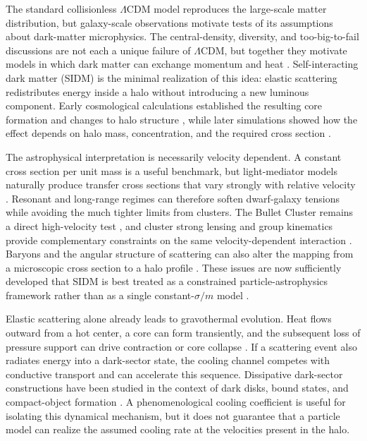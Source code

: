 \documentclass[12pt]{iopart}
\begin{document}
The standard collisionless $\Lambda$CDM model reproduces the large-scale
matter distribution, but galaxy-scale observations motivate tests of its
assumptions about dark-matter microphysics.  The central-density, diversity,
and too-big-to-fail discussions are not each a unique failure of
$\Lambda$CDM, but together they motivate models in which dark matter can
exchange momentum and heat \citep{BullockBoylan2017}.  Self-interacting dark
matter (SIDM) is the minimal realization of this idea: elastic scattering
redistributes energy inside a halo without introducing a new luminous
component.  Early cosmological calculations established the resulting core
formation and changes to halo structure \citep{Spergel2000,Dave2001,Colin2002},
while later simulations showed how the effect depends on halo mass,
concentration, and the required cross section
\citep{Elbert2015,GarrisonKimmel2013,Tulin2018review}.

The astrophysical interpretation is necessarily velocity dependent.  A
constant cross section per unit mass is a useful benchmark, but light-mediator
models naturally produce transfer cross sections that vary strongly with
relative velocity \citep{TulinYuZurek2013,Kaplinghat2016}.  Resonant and
long-range regimes can therefore soften dwarf-galaxy tensions while avoiding
the much tighter limits from clusters.  The Bullet Cluster remains a direct
high-velocity test \citep{Randall2008}, and cluster strong lensing and group
kinematics provide complementary constraints on the same velocity-dependent
interaction \citep{Andrade2022,Kahlhoefer2014,Sagunski2021}.  Baryons and the
angular structure of scattering can also alter the mapping from a microscopic
cross section to a halo profile \citep{Robertson2017,Shen2021}.  These issues
are now sufficiently developed that SIDM is best treated as a constrained
particle-astrophysics framework rather than as a single constant-$\sigma/m$
model \citep{Adhikari2025}.

Elastic scattering alone already leads to gravothermal evolution.  Heat flows
outward from a hot center, a core can form transiently, and the subsequent
loss of pressure support can drive contraction or core collapse
\citep{Balberg2002,KodaShapiro2011,Nishikawa2020,Outmezguine2023}.  If a
scattering event also radiates energy into a dark-sector state, the cooling
channel competes with conductive transport and can accelerate this sequence.
Dissipative dark-sector constructions have been studied in the context of
dark disks, bound states, and compact-object formation
\citep{Fan2013,WiseZhang2014,Essig2019,Xiao2021}.  A phenomenological cooling
coefficient is useful for isolating this dynamical mechanism, but it does not
guarantee that a particle model can realize the assumed cooling rate at the
velocities present in the halo.
\end{document}
